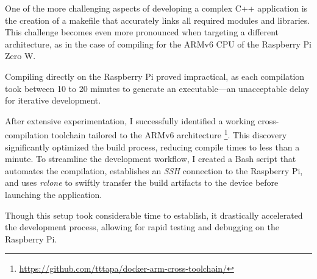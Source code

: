 One of the more challenging aspects of developing a complex C++ application is the creation of a makefile that accurately links all required modules and libraries. This challenge becomes even more pronounced when targeting a different architecture, as in the case of compiling for the ARMv6 CPU of the Raspberry Pi Zero W.

Compiling directly on the Raspberry Pi proved impractical, as each compilation took between 10 to 20 minutes to generate an executable—an unacceptable delay for iterative development. 

After extensive experimentation, I successfully identified a working cross-compilation toolchain tailored to the ARMv6 architecture \footnote{\url{https://github.com/tttapa/docker-arm-cross-toolchain/}}. This discovery significantly optimized the build process, reducing compile times to less than a minute. To streamline the development workflow, I created a Bash script that automates the compilation, establishes an \textit{SSH} connection to the Raspberry Pi, and uses \textit{rclone} to swiftly transfer the build artifacts to the device before launching the application.

Though this setup took considerable time to establish, it drastically accelerated the development process, allowing for rapid testing and debugging on the Raspberry Pi.
